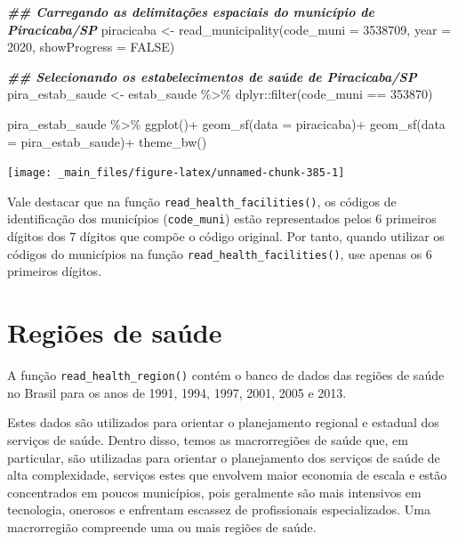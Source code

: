 \documentclass[
  brazilian,
]{book}
\newenvironment{Shaded}{\begin{snugshade}}{\end{snugshade}}
\newcommand{\AttributeTok}[1]{\textcolor[rgb]{0.77,0.63,0.00}{#1}}
\newcommand{\ConstantTok}[1]{\textcolor[rgb]{0.00,0.00,0.00}{#1}}
\newcommand{\DecValTok}[1]{\textcolor[rgb]{0.00,0.00,0.81}{#1}}
\newcommand{\DocumentationTok}[1]{\textcolor[rgb]{0.56,0.35,0.01}{\textbf{\textit{#1}}}}
\newcommand{\FunctionTok}[1]{\textcolor[rgb]{0.00,0.00,0.00}{#1}}
\newcommand{\NormalTok}[1]{#1}
\newcommand{\OtherTok}[1]{\textcolor[rgb]{0.56,0.35,0.01}{#1}}
\newcommand{\SpecialCharTok}[1]{\textcolor[rgb]{0.00,0.00,0.00}{#1}}
\begin{document}
\begin{Shaded}
\begin{Highlighting}[]
\DocumentationTok{\#\# Carregando as delimitações espaciais do município de Piracicaba/SP}
\NormalTok{piracicaba }\OtherTok{\textless{}{-}} \FunctionTok{read\_municipality}\NormalTok{(}\AttributeTok{code\_muni =} \DecValTok{3538709}\NormalTok{,}
                                \AttributeTok{year =} \DecValTok{2020}\NormalTok{,}
                                \AttributeTok{showProgress =} \ConstantTok{FALSE}\NormalTok{)}

\DocumentationTok{\#\# Selecionando os estabelecimentos de saúde de Piracicaba/SP}
\NormalTok{pira\_estab\_saude }\OtherTok{\textless{}{-}}\NormalTok{ estab\_saude }\SpecialCharTok{\%\textgreater{}\%} 
\NormalTok{  dplyr}\SpecialCharTok{::}\FunctionTok{filter}\NormalTok{(code\_muni }\SpecialCharTok{==} \DecValTok{353870}\NormalTok{)}

\NormalTok{pira\_estab\_saude }\SpecialCharTok{\%\textgreater{}\%} 
  \FunctionTok{ggplot}\NormalTok{()}\SpecialCharTok{+}
  \FunctionTok{geom\_sf}\NormalTok{(}\AttributeTok{data =}\NormalTok{ piracicaba)}\SpecialCharTok{+}
  \FunctionTok{geom\_sf}\NormalTok{(}\AttributeTok{data =}\NormalTok{ pira\_estab\_saude)}\SpecialCharTok{+}
  \FunctionTok{theme\_bw}\NormalTok{()}
\end{Highlighting}
\end{Shaded}

\begin{center}\texttt{[image: \_main\_files/figure-latex/unnamed-chunk-385-1]} \end{center}

Vale destacar que na função \texttt{read\_health\_facilities()}, os códigos de identificação dos municípios (\texttt{code\_muni}) estão representados pelos 6 primeiros dígitos dos 7 dígitos que compõe o código original. Por tanto, quando utilizar os códigos do municípios na função \texttt{read\_health\_facilities()}, use apenas os 6 primeiros dígitos.

\hypertarget{regiuxf5es-de-sauxfade}{%
\section{Regiões de saúde}\label{regiuxf5es-de-sauxfade}}

A função \texttt{read\_health\_region()} contém o banco de dados das regiões de saúde no Brasil para os anos de 1991, 1994, 1997, 2001, 2005 e 2013.

Estes dados são utilizados para orientar o planejamento regional e estadual dos serviços de saúde. Dentro disso, temos as macrorregiões de saúde que, em particular, são utilizadas para orientar o planejamento dos serviços de saúde de alta complexidade, serviços estes que envolvem maior economia de escala e estão concentrados em poucos municípios, pois geralmente são mais intensivos em tecnologia, onerosos e enfrentam escassez de profissionais especializados. Uma macrorregião compreende uma ou mais regiões de saúde.
\end{document}
